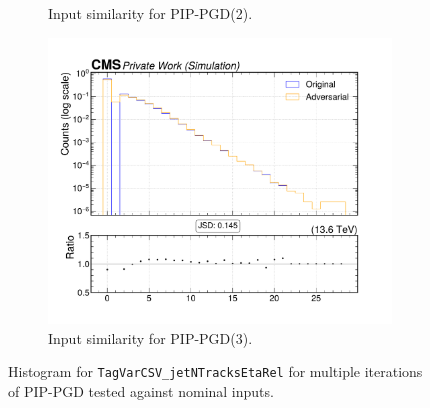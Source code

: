\begin{figure}[htbp]
\begin{subfigure}[t]{0.32\textwidth}
    \caption*{Input similarity for PIP-PGD(2).}
  \end{subfigure}\hfill
  \begin{subfigure}[t]{0.32\textwidth}
    \includegraphics[width=\linewidth]{media/output/features/compare/combined_it_3/cmp_global_features_TagVarCSV_jetNTracksEtaRel.pdf}
    \caption*{Input similarity for PIP-PGD(3).}
  \end{subfigure}

  \caption*{Histogram for \texttt{TagVarCSV\_jetNTracksEtaRel} for multiple iterations of PIP-PGD tested against nominal inputs.}
  \label{fig:combined_input_TagVarCSV_jetNTracksEtaRel}
\end{figure}

